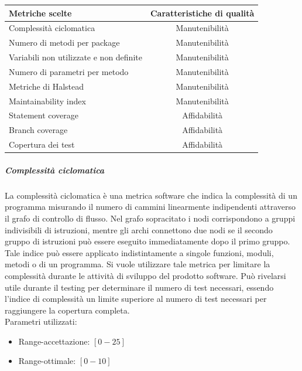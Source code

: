 \begin{center}

  \begin{tabular}{|l|c|}
    \hline
    \textbf{Metriche scelte} & \textbf{Caratteristiche di qualità} \\
    \hline
    Complessità ciclomatica  & Manutenibilità \\
    Numero di metodi per package & Manutenibilità \\
    Variabili non utilizzate e non definite & Manutenibilità \\
    Numero di parametri per metodo & Manutenibilità \\
    Metriche di Halstead  & Manutenibilità \\
    Maintainability index  & Manutenibilità \\
    Statement coverage & Affidabilità \\
    Branch coverage & Affidabilità \\
    Copertura dei test & Affidabilità \\
    \hline
  \end{tabular}
\end{center}


\subparagraph{Complessità ciclomatica}
La complessità ciclomatica è una metrica software che indica la complessità di un programma
misurando il numero di cammini linearmente indipendenti attraverso il grafo di controllo di flusso.
Nel grafo sopracitato i nodi corrispondono a gruppi indivisibili di istruzioni, mentre gli archi
connettono due nodi se il secondo gruppo di istruzioni può essere eseguito immediatamente dopo
il primo gruppo. Tale indice può essere applicato indistintamente a singole funzioni, moduli,
metodi o  di un programma. Si vuole utilizzare tale metrica per limitare la complessità
durante le attività di sviluppo del prodotto software. Può rivelarsi utile durante il testing per
determinare il numero  di test necessari, essendo l'indice di complessità un limite superiore
al numero di test necessari per raggiungere la copertura completa. \\

Parametri utilizzati:
\begin{itemize}
\item Range-accettazione: $[0 - 25]$
\item Range-ottimale: $[0 - 10]$
\end{itemize}

